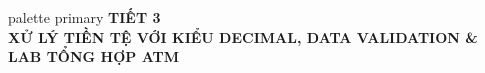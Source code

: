 \documentclass[aspectratio=169, 10pt]{beamer}
\begin{document}
\begin{frame}[plain]
  \vfill
  \centering
  \begin{beamercolorbox}[sep=8pt,center,shadow=true,rounded=true]{palette primary}
    {\Huge \textbf{TIẾT 3}}\\[2mm]
    {\Large \textbf{XỬ LÝ TIỀN TỆ VỚI KIỂU DECIMAL, DATA VALIDATION \& LAB TỔNG HỢP ATM}}
  \end{beamercolorbox}
  \vfill
\end{frame}

\end{document}
